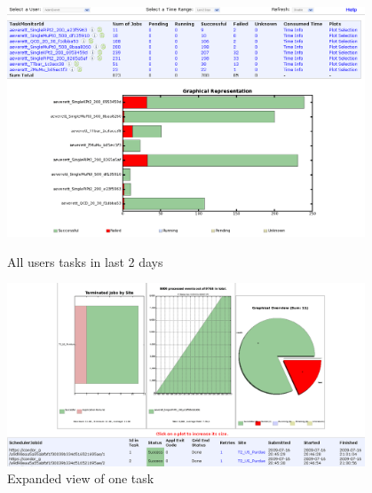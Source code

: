 \begin{figure}
\begin{minipage}{.45\textwidth}
\centering
 \includegraphics[width=0.95\textwidth]{figures/TaskMonitor1.png}
\caption{All users tasks in last 2 days}
\label{fig:TaskMonitor1}
\end{minipage}
\begin{minipage}{.45\textwidth}
\centering
\includegraphics[width=0.95\textwidth]{figures/TaskMonitor2.png}
\caption{Expanded view of one task}
\label{fig:TaskMonitor2}
\end{minipage}
\end{figure}

